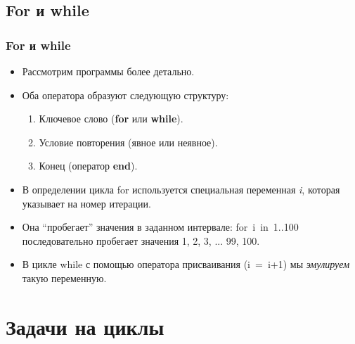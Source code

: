 \documentclass[compress,red]{beamer}
\begin{document}
\subsection{For и while}
\begin{frame}[fragile]
  \frametitle{For и while}
		\begin{itemize}
  		\item Рассмотрим программы более детально.
  		\item Оба оператора образуют следующую структуру:
  		  \begin{enumerate}
  		    \item Ключевое слово (\textbf{for} или \textbf{while}).
  		    \item Условие повторения (явное или неявное).
  		    \item Конец (оператор \textbf{end}).
  		  \end{enumerate}
  		\item В определении цикла for используется специальная переменная \emph{i}, которая указывает на номер итерации.
  		\item Она ``пробегает'' значения в заданном интервале: for~i~in~1..100 последовательно пробегает значения 1, 2, 3, ... 99, 100.
  		\item В цикле while с помощью оператора присваивания (i~=~i+1) мы \emph{эмулируем} такую переменную.
  	\end{itemize}
\end{frame}

\section{Задачи на циклы}
\end{document}
